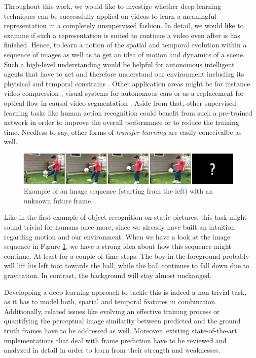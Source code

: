 Throughout this work, we would like to investige whether deep learning techniques can be successfully applied on videos to learn a meaningful representation in a completely unsupervised fashion. In detail, we would like to examine if such a representation is suited to continue a video even after is has finished. Hence, to learn a notion of the spatial and temporal evolution within a sequence of images as well as to get an idea of motion and dynamics of a scene. Such a high-level understanding would be helpful for autonomous intelligent agents that have to act and therefore understand our environment including its phyisical and temporal constrains \parencite{unsup_learn_lstm}. Other application areas might be for instance video compression \parencite{frame_interpol}, visual systems for autonomous cars or as a replacement for optical flow in causal video segmentation \parencite{causal_video_seg}. Aside from that, other supervised learning tasks like human action recognition could benefit from such a pre-trained network in order to improve the overall performance or to reduce the training time. Needless to say, other forms of \textit{transfer learning} are easily conceivalbe as well.

\begin{figure}[htpb]
	\centering
	\includegraphics[width=1.0\linewidth]{figures/ucf-intro/serie1.png} 
	\caption[Example: Image sequence]{Example of an image sequence (starting from the left) with an unknown future frame.} \label{fig:intro-seq}
\end{figure}

Like in the first example of object recognition on static pictures, this task might sound trivial for humans once more, since we already have built an intuition regarding motion and our environment. When we have a look at the image sequence in Figure \ref{fig:intro-seq}, we have a strong idea about how this sequence might continue. At least for a couple of time steps. The boy in the foreground probably will lift his left foot towards the ball, while the ball continues to fall down due to gravitation. In contrast, the background will stay almost unchanged.

Developping a deep learning approach to tackle this is indeed a non-trivial task, as it has to model both, spatial and temporal features in combination. Additionally, related issues like evolving an effective training process or quantifying the perceptual image similarity between predicted and the ground truth frames have to be addressed as well. Moreover, existing state-of-the-art implementations that deal with frame prediction have to be reviewed and analyzed in detail in order to learn from their strength and weaknesses.


